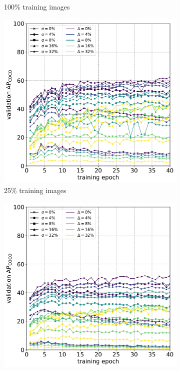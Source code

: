 \begin{figure}[phbt!]
\begin{subfigure}[t]{0.5\linewidth}
  \caption{100\% training images}
\end{subfigure}
\begin{subfigure}[t]{0.5\linewidth}
  \includegraphics[width=1.0\linewidth]{charts/training/noise_4_training.pdf}
  \caption{25\% training images}
\end{subfigure}%
\begin{subfigure}[t]{0.5\linewidth}
  \includegraphics[width=1.0\linewidth]{charts/training/noise_16_training.pdf}

\end{subfigure}
\end{figure}
